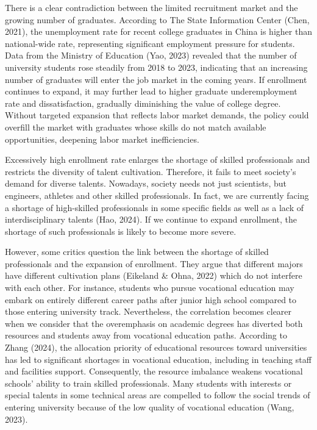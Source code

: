 \documentclass{studentpaper}
\begin{document}
There is a clear contradiction between the limited recruitment market and the growing number of graduates. 
According to The State Information Center (Chen, 2021), the unemployment rate for recent college graduates in China is higher than national-wide rate, representing significant employment pressure for students. 
Data from the Ministry of Education (Yao, 2023) revealed that the number of university students rose steadily from 2018 to 2023, indicating that an increasing number of graduates will enter the job market in the coming years. 
If enrollment continues to expand, it may further lead to higher graduate underemployment rate and dissatisfaction, gradually diminishing the value of college degree. Without targeted expansion that reflects labor market demands, the policy could overfill the market with graduates whose skills do not match available opportunities, deepening labor market inefficiencies.
\par
Excessively high enrollment rate enlarges the shortage of skilled professionals and restricts the diversity of talent cultivation. 
Therefore, it fails to meet society's demand for diverse talents. Nowadays, society needs not just scientists, but engineers, athletes and other skilled professionals. 
In fact, we are currently facing a shortage of high-skilled professionals in some specific fields as well as a lack of interdisciplinary talents (Hao, 2024). 
If we continue to expand enrollment, the shortage of such professionals is likely to become more severe.
\par
However, some critics question the link between the shortage of skilled professionals and the expansion of enrollment. 
They argue that different majors have different cultivation plans (Eikeland \& Ohna, 2022) which do not interfere with each other. 
For instance, students who pursue vocational education may embark on entirely different career paths after junior high school compared to those entering university track. 
Nevertheless, the correlation becomes clearer when we consider that the overemphasis on academic degrees has diverted both resources and students away from vocational education paths. 
According to Zhang (2024), the allocation priority of educational resources toward universities has led to significant shortages in vocational education, including in teaching staff and facilities support. 
Consequently, the resource imbalance weakens vocational schools’ ability to train skilled professionals. 
Many students with interests or special talents in some technical areas are compelled to follow the social trends of entering university because of the low quality of vocational education (Wang, 2023). 
\end{document}
